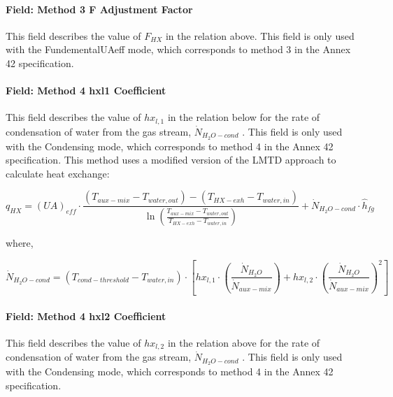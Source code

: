 \paragraph{Field: Method 3 F Adjustment Factor}\label{field-method-3-f-adjustment-factor}

This field describes the value of \({F_{HX}}\) in the relation above. This field is only used with the FundementalUAeff mode, which corresponds to method 3 in the Annex 42 specification.

\paragraph{Field: Method 4 hxl1 Coefficient}\label{field-method-4-hxl1-coefficient}

This field describes the value of \(h{x_{l,1}}\) in the relation below for the rate of condensation of water from the gas stream, \({\dot N_{{H_2}O - cond}}\) . This field is only used with the Condensing mode, which corresponds to method 4 in the Annex 42 specification. This method uses a modified version of the LMTD approach to calculate heat exchange:

\begin{equation}
{q_{HX}} = {\left( {UA} \right)_{eff}} \cdot \frac{{\left( {{T_{aux - mix}} - {T_{water,out}}} \right) - \left( {{T_{HX - exh}} - {T_{water,in}}} \right)}}{{\ln \left( {\frac{{{T_{aux - mix}} - {T_{water,out}}}}{{{T_{HX - exh}} - {T_{water,in}}}}} \right)}} + {\dot N_{{H_2}O - cond}} \cdot {\hat h_{fg}}
\end{equation}

where,

\begin{equation}
{\dot N_{{H_2}O - cond}} = \left( {{T_{cond - threshold}} - {T_{water,in}}} \right) \cdot \left[ {h{x_{l,1}} \cdot \left( {\frac{{{{\dot N}_{{H_2}O}}}}{{{{\dot N}_{aux - mix}}}}} \right) + h{x_{l,2}} \cdot {{\left( {\frac{{{{\dot N}_{{H_2}O}}}}{{{{\dot N}_{aux - mix}}}}} \right)}^2}} \right]
\end{equation}

\paragraph{Field: Method 4 hxl2 Coefficient}\label{field-method-4-hxl2-coefficient}

This field describes the value of \(h{x_{l,2}}\) in the relation above for the rate of condensation of water from the gas stream, \({\dot N_{{H_2}O - cond}}\) . This field is only used with the Condensing mode, which corresponds to method 4 in the Annex 42 specification.

